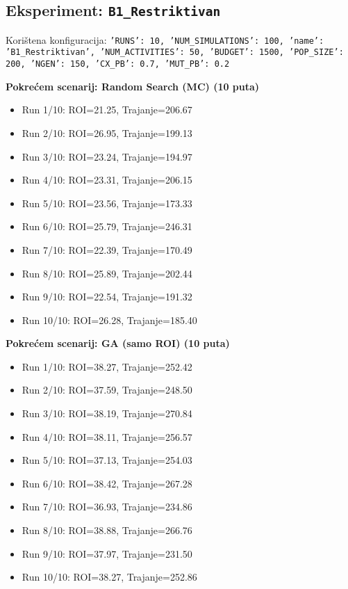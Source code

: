 \subsection*{Eksperiment: \texttt{B1\_Restriktivan}}
Korištena konfiguracija: \texttt{'RUNS': 10, 'NUM\_SIMULATIONS': 100, 'name': 'B1\_Restriktivan', 'NUM\_ACTIVITIES': 50, 'BUDGET': 1500, 'POP\_SIZE': 200, 'NGEN': 150, 'CX\_PB': 0.7, 'MUT\_PB': 0.2}

\textbf{Pokrećem scenarij: Random Search (MC) (10 puta)}
\begin{itemize}
    \item Run 1/10: ROI=21.25, Trajanje=206.67
    \item Run 2/10: ROI=26.95, Trajanje=199.13
    \item Run 3/10: ROI=23.24, Trajanje=194.97
    \item Run 4/10: ROI=23.31, Trajanje=206.15
    \item Run 5/10: ROI=23.56, Trajanje=173.33
    \item Run 6/10: ROI=25.79, Trajanje=246.31
    \item Run 7/10: ROI=22.39, Trajanje=170.49
    \item Run 8/10: ROI=25.89, Trajanje=202.44
    \item Run 9/10: ROI=22.54, Trajanje=191.32
    \item Run 10/10: ROI=26.28, Trajanje=185.40
\end{itemize}

\textbf{Pokrećem scenarij: GA (samo ROI) (10 puta)}
\begin{itemize}
    \item Run 1/10: ROI=38.27, Trajanje=252.42
    \item Run 2/10: ROI=37.59, Trajanje=248.50
    \item Run 3/10: ROI=38.19, Trajanje=270.84
    \item Run 4/10: ROI=38.11, Trajanje=256.57
    \item Run 5/10: ROI=37.13, Trajanje=254.03
    \item Run 6/10: ROI=38.42, Trajanje=267.28
    \item Run 7/10: ROI=36.93, Trajanje=234.86
    \item Run 8/10: ROI=38.88, Trajanje=266.76
    \item Run 9/10: ROI=37.97, Trajanje=231.50
    \item Run 10/10: ROI=38.27, Trajanje=252.86
\end{itemize}

